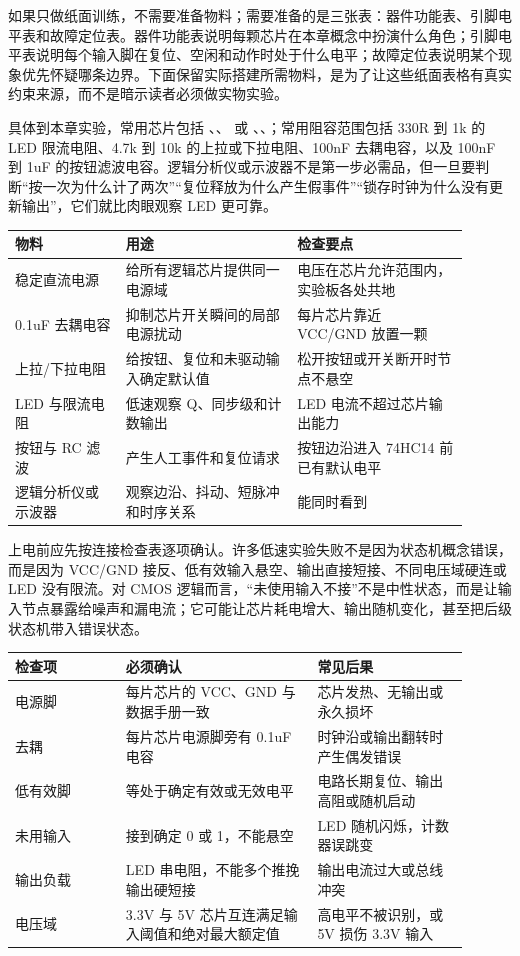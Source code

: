 如果只做纸面训练，不需要准备物料；需要准备的是三张表：器件功能表、引脚电平表和故障定位表。器件功能表说明每颗芯片在本章概念中扮演什么角色；引脚电平表说明每个输入脚在复位、空闲和动作时处于什么电平；故障定位表说明某个现象优先怀疑哪条边界。下面保留实际搭建所需物料，是为了让这些纸面表格有真实约束来源，而不是暗示读者必须做实物实验。

具体到本章实验，常用芯片包括 、、 或 、、；常用阻容范围包括 330R 到 1k 的 LED 限流电阻、4.7k 到 10k 的上拉或下拉电阻、100nF 去耦电容，以及 100nF 到 1uF 的按钮滤波电容。逻辑分析仪或示波器不是第一步必需品，但一旦要判断“按一次为什么计了两次”“复位释放为什么产生假事件”“锁存时钟为什么没有更新输出”，它们就比肉眼观察 LED 更可靠。

\begin{longtable}{L{0.22\linewidth}L{0.34\linewidth}L{0.34\linewidth}}
\toprule
物料 & 用途 & 检查要点 \\
\midrule
稳定直流电源 & 给所有逻辑芯片提供同一电源域 & 电压在芯片允许范围内，实验板各处共地 \\
0.1uF 去耦电容 & 抑制芯片开关瞬间的局部电源扰动 & 每片芯片靠近 VCC/GND 放置一颗 \\
上拉/下拉电阻 & 给按钮、复位和未驱动输入确定默认值 & 松开按钮或开关断开时节点不悬空 \\
LED 与限流电阻 & 低速观察 Q、同步级和计数输出 & LED 电流不超过芯片输出能力 \\
按钮与 RC 滤波 & 产生人工事件和复位请求 & 按钮边沿进入 74HC14 前已有默认电平 \\
逻辑分析仪或示波器 & 观察边沿、抖动、短脉冲和时序关系 & 能同时看到  \\
\bottomrule
\end{longtable}

上电前应先按连接检查表逐项确认。许多低速实验失败不是因为状态机概念错误，而是因为 VCC/GND 接反、低有效输入悬空、输出直接短接、不同电压域硬连或 LED 没有限流。对 CMOS 逻辑而言，“未使用输入不接”不是中性状态，而是让输入节点暴露给噪声和漏电流；它可能让芯片耗电增大、输出随机变化，甚至把后级状态机带入错误状态。

\begin{longtable}{L{0.22\linewidth}L{0.38\linewidth}L{0.3\linewidth}}
\toprule
检查项 & 必须确认 & 常见后果 \\
\midrule
电源脚 & 每片芯片的 VCC、GND 与数据手册一致 & 芯片发热、无输出或永久损坏 \\
去耦 & 每片芯片电源脚旁有 0.1uF 电容 & 时钟沿或输出翻转时产生偶发错误 \\
低有效脚 &  等处于确定有效或无效电平 & 电路长期复位、输出高阻或随机启动 \\
未用输入 & 接到确定 0 或 1，不能悬空 & LED 随机闪烁，计数器误跳变 \\
输出负载 & LED 串电阻，不能多个推挽输出硬短接 & 输出电流过大或总线冲突 \\
电压域 & 3.3V 与 5V 芯片互连满足输入阈值和绝对最大额定值 & 高电平不被识别，或 5V 损伤 3.3V 输入 \\
\bottomrule
\end{longtable}

